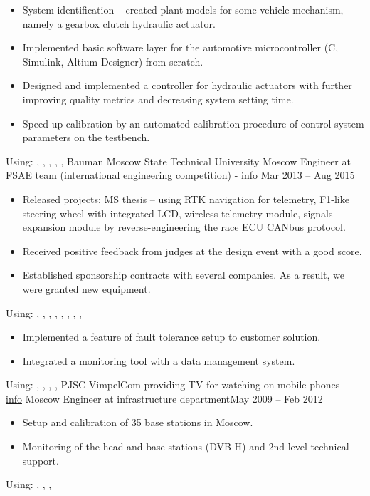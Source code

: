 \begin{itemize}
    \item System identification -- created plant models for some vehicle mechanism, namely a gearbox clutch hydraulic actuator.
    \item Implemented basic software layer for the automotive microcontroller (C, Simulink, Altium Designer) from scratch.
    \item Designed and implemented a controller for hydraulic actuators with further improving quality metrics and decreasing system setting time.
    \item Speed up calibration by an automated calibration procedure of control system parameters on the testbench.
\end{itemize}
Using: , ,  , , , 
\horizontalline
% 
\ressubheading
{Bauman Moscow State Technical University}
{}
{Moscow}
{Engineer at FSAE team (international engineering competition) - \href{https://baumanracing.ru/en/}{info}}
{Mar 2013 -- Aug 2015}
\begin{itemize}
    \item Released projects: MS thesis -- using RTK navigation for telemetry, F1-like steering wheel with integrated LCD, wireless telemetry module, signals expansion module by reverse-engineering the race ECU CANbus protocol.
    \item Received positive feedback from judges at the design event with a good score.
    \item Established sponsorship contracts with several companies. As a result, we were granted new equipment.
\end{itemize}
Using: , , , , , , , , 
\horizontalline
% 
\begin{itemize}
    \item Implemented a feature of fault tolerance setup to customer solution.
    \item Integrated a monitoring tool with a data management system.
\end{itemize}
Using: , , , , 
\horizontalline
% 
\ressubheading
{PJSC VimpelCom}
{providing TV for watching on mobile phones - \href{https://www.dvb.org/news/russia-to-launch-dvb-h-services}{info}}
{Moscow}
{Engineer at infrastructure department}{May 2009 -- Feb 2012}
\begin{itemize}
    \item Setup and calibration of 35 base stations in Moscow.
    \item Monitoring of the head and base stations (DVB-H) and 2nd level technical support.
\end{itemize}
Using: , , , 

